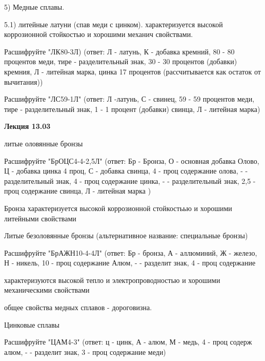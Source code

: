 {\begin{center}
    \par 5) Медные сплавы. 

    \par 5.1) литейные латуни (спав меди с цинком). характеризуется высокой коррозионной стойкостью и хорошими механич свойствами. 

    \par Расшифруйте "ЛК80-3Л) (ответ: Л - латунь, К - добавка кремний, 80 - 80 процентов меди, тире - разделительный знак, 30 - 30 процентов (добавки) кремния, Л - литейная марка, цинка 17 процентов (рассчитывается как остаток от вычитания))

    \par Расшифруйте "ЛС59-1Л" (ответ: Л -латунь, С - свинец, 59 - 59 процентов меди, тире - разделительный знак, 1 - 1 процент (добавки) свинца, Л - литейная марка)

    \par \textbf{Лекция 13.03}

    \par литые оловянные бронзы 

    \par Расшифруйте "БрОЦС4-4-2,5Л" (ответ: Бр - Бронза, О - основная добавка Олово, Ц - добавка цинка 4 проц, С - добавка свинца, 4 - проц содержание олова, - - разделительный знак, 4 - проц содержание цинка, - - разделительный знак, 2,5 - проц содержание свинца, Л - литейная марка )

    \par Бронза характеризуется высокой коррозионной стойкостьью и хорошими литейными свойствами

    \par Литые безоловянные бронзы (альтернативное название: специальные бронзы)

    \par Расшифруйте "БрАЖН10-4-4Л" (ответ: Бр - бронза, А - аллюминий, Ж - железо, Н - никель, 10 - проц содержание Алюм, - - разделит знак, 4 - проц содержание 

    \par характеризуются высокой тепло и электропроводностью и хорошими механическими свойствами

    \par общее свойства медных сплавов - дороговизна.

    \par Цинковые сплавы

    \par Расшифруйте "ЦАМ4-3" (ответ: ц - цинк, А - алюм, М - медь, 4 - проц содерж алюм, - - разделит знак, 3 - проц содержание меди)


\end{center}}
